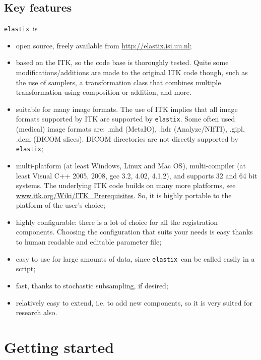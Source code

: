 \documentclass[]{report}
\newcommand{\elastix}{\texttt{elastix}}
\begin{document}
\subsection{Key features}\label{sec:elastix:key}

\elastix\ is
\begin{itemize}
\item open source, freely available from \url{http://elastix.isi.uu.nl};

\item based on the ITK, so the code base is thoroughly tested.
Quite some modifications/additions are made to the original ITK
code though, such as the use of samplers, a transformation class
that combines multiple transformation using composition or
addition, and more.

\item suitable for many image formats. The use of ITK implies that
all image formats supported by ITK are supported by \elastix. Some
often used (medical) image formats are: .mhd (MetaIO), .hdr
(Analyze/NIfTI), .gipl, .dcm (DICOM slices). DICOM directories are
not directly supported by \elastix;

\item multi-platform (at least Windows, Linux and Mac OS), multi-compiler
(at least Visual C++ 2005, 2008, gcc 3.2, 4.02, 4.1.2), and supports
32 and 64 bit systems. The underlying ITK code builds on many more
platforms, see \url{www.itk.org/Wiki/ITK_Prerequisites}. So, it is
highly portable to the platform of the user's choice;

\item highly configurable: there is a lot of choice for all the registration
components. Choosing the configuration that suits your needs is easy
thanks to human readable and editable parameter file;

\item easy to use for large amounts of data, since \elastix\ can be
called easily in a script;

\item fast, thanks to stochastic subsampling, if desired;

\item relatively easy to extend, i.e. to add new components, so it is
very suited for research also.
\end{itemize}

\section{Getting started}\label{sec:elastix:install}
\end{document}
